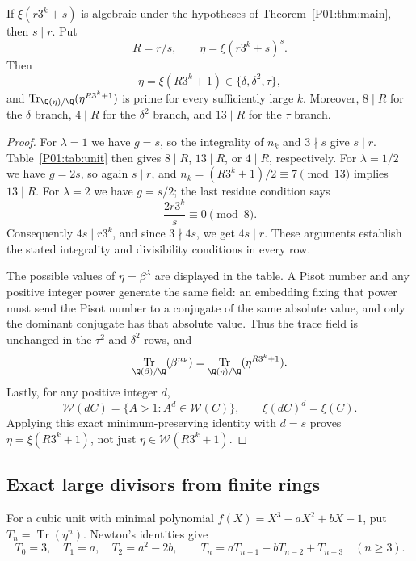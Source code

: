 \documentclass[11pt,a4paper]{article}
\theoremstyle{definition}\newtheorem{definition}[theorem]{Definition}
\theoremstyle{remark}\newtheorem{remark}[theorem]{Remark}
\DeclareMathOperator{\Tr}{Tr}\DeclareMathOperator{\tr}{tr}\DeclareMathOperator{\Nm}{N}
\begin{document}
\begin{proposition}\label{P01:prop:normalized}
If $\xi(r3^k+s)$ is algebraic under the hypotheses of
Theorem~\ref{P01:thm:main}, then $s\mid r$. Put
\[
 R=r/s,\qquad \eta=\xi(r3^k+s)^s.
\]
Then
\[
 \eta=\xi(R3^k+1)\in\{\delta,\delta^2,\tau\},
\]
and $\Tr_{\Q(\eta)/\Q}(\eta^{R3^k+1})$ is prime for every sufficiently
large $k$. Moreover, $8\mid R$ for the $\delta$ branch,
$4\mid R$ for the $\delta^2$ branch, and $13\mid R$ for the $\tau$ branch.
\end{proposition}
\begin{proof}
For $\lambda=1$ we have $g=s$, so the integrality of $n_k$ and
$3\nmid s$ give $s\mid r$. Table~\ref{P01:tab:unit} then gives
$8\mid R$, $13\mid R$, or $4\mid R$, respectively.
For $\lambda=1/2$ we have $g=2s$, so again $s\mid r$, and
$n_k=(R3^k+1)/2\equiv7\pmod{13}$ implies $13\mid R$.
For $\lambda=2$ we have $g=s/2$; the last residue condition says
\[
       \frac{2r3^k}{s}\equiv0\pmod8.
\]
Consequently $4s\mid r3^k$, and since $3\nmid4s$, we get
$4s\mid r$. These arguments establish the stated integrality and
divisibility conditions in every row.

The possible values of $\eta=\beta^\lambda$ are displayed in the table.
A Pisot number and any positive integer power generate the same field:
an embedding fixing that power must send the Pisot number to a conjugate
of the same absolute value, and only the dominant conjugate has that
absolute value. Thus the trace field is unchanged in the $\tau^2$ and
$\delta^2$ rows, and
\[
 \Tr_{\Q(\beta)/\Q}(\beta^{n_k})
       =\Tr_{\Q(\eta)/\Q}(\eta^{R3^k+1}).
\]
Lastly, for any positive integer $d$,
\[
 \mathcal W(dC)=\{A>1:A^d\in\mathcal W(C)\},
 \qquad \xi(dC)^d=\xi(C).
\]
Applying this exact minimum-preserving identity with $d=s$ proves
$\eta=\xi(R3^k+1)$, not just $\eta\in\mathcal W(R3^k+1)$.
\end{proof}

\subsection{Exact large divisors from finite rings}\label{P01:sec:finite}

For a cubic unit with minimal polynomial
$f(X)=X^3-aX^2+bX-1$, put $T_n=\Tr(\eta^n)$.
Newton's identities give
\begin{equation}\label{P01:eq:newton}
 T_0=3,\quad T_1=a,\quad T_2=a^2-2b,\qquad
 T_n=aT_{n-1}-bT_{n-2}+T_{n-3}\quad(n\geq3).
\end{equation}
\end{document}
